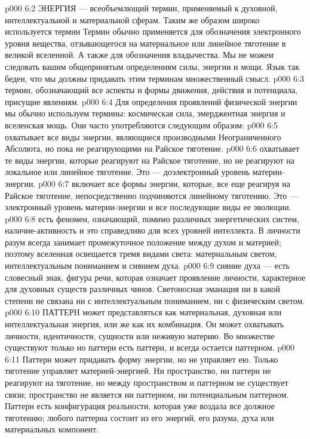 \vs p000 6:2 \pc ЭНЕРГИЯ --- всеобъемлющий термин, применяемый к духовной, интеллектуальной и материальной сферам. Таким же образом широко используется термин  Термин  обычно применяется для обозначения электронного уровня вещества, отзывающегося на материальное или линейное тяготение в великой вселенной. А также для обозначения владычества. Мы не можем следовать вашим общепринятым определениям силы, энергии и мощи. Язык так беден, что мы должны придавать этим терминам множественный смысл.
\vs p000 6:3 \pc {} термин, обозначающий все аспекты и формы движения, действия и потенциала, присущие явлениям.
\vs p000 6:4 Для определения проявлений физической энергии мы обычно используем термины: космическая сила, эмерджентная энергия и вселенская мощь. Они часто употребляются следующим образом:
\vs p000 6:5 \bibnobreakspace {} охватывает все виды энергии, являющиеся производными Неограниченного Абсолюта, но пока не реагирующими на Райское тяготение.
\vs p000 6:6 \bibnobreakspace {} охватывает те виды энергии, которые реагируют на Райское тяготение, но не реагируют на локальное или линейное тяготение. Это --- доэлектронный уровень материи\hyp{}энергии.
\vs p000 6:7 \bibnobreakspace {} включает все формы энергии, которые, все еще реагируя на Райское тяготение, непосредственно подчиняются линейному тяготению. Это --- электронный уровень материи\hyp{}энергии и все последующие виды ее эволюции.
\vs p000 6:8 \pc {} есть феномен, означающий, помимо различных энергетических систем, наличие\hyp{}активность  и это справедливо для всех уровней интеллекта. В личности разум всегда занимает промежуточное положение между духом и материей; поэтому вселенная освещается тремя видами света: материальным светом, интеллектуальным пониманием и сиянием духа.
\vs p000 6:9 \pc {} сияние духа --- есть словесный знак, фигура речи, которая означает проявление личности, характерное для духовных существ различных чинов. Светоносная эманация ни в какой степени не связана ни с интеллектуальным пониманием, ни с физическим светом.
\vs p000 6:10 \pc ПАТТЕРН может представляться как материальная, духовная или интеллектуальная энергия, или же как их комбинация. Он может охватывать личности, идентичности, сущности или неживую материю. Во множестве существуют только  но паттерн есть паттерн, и всегда остается паттерном.
\vs p000 6:11 Паттерн может придавать форму энергии, но не управляет ею. Только тяготение управляет материей\hyp{}энергией. Ни пространство, ни паттерн не реагируют на тяготение, но между пространством и паттерном не существует связи; пространство не является ни паттерном, ни потенциальным паттерном. Паттерн есть конфигурация реальности, которая уже воздала все должное тяготению;  любого паттерна состоит из его энергий, его разума, духа или материальных компонент.
